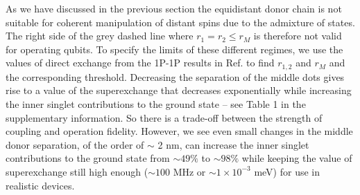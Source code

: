 \documentclass[%
showkeys,
 amsmath,amssymb,
 aps,
prb,
]{revtex4-2}
\begin{document}
As we have discussed in the previous section the equidistant donor chain is not suitable for coherent manipulation of distant spins due to the admixture of states. The right side of the grey dashed line where $r_1=r_2 \leq r_M$ is therefore not valid for operating qubits. To specify the limits of these different regimes, we use the values of direct exchange from the 1P-1P results in Ref. \cite{wangHighlyTunableExchange2016a} to find $r_{1,2}$ and $r_M$ and the corresponding threshold. Decreasing the separation of the middle dots gives rise to a value of the superexchange that decreases exponentially while increasing the inner singlet contributions to the ground state -- see Table 1 in the supplementary information. So there is a trade-off between the strength of coupling and operation fidelity. However, we see even small changes in the middle donor separation, of the order of $\sim$ 2 nm, can increase the inner singlet contributions to the ground state from $\sim49\%$ to $\sim98\%$ while keeping the value of superexchange still high enough ($\sim100$ MHz or $\sim1\times10^{-3}$ meV) for use in realistic devices.
\end{document}
